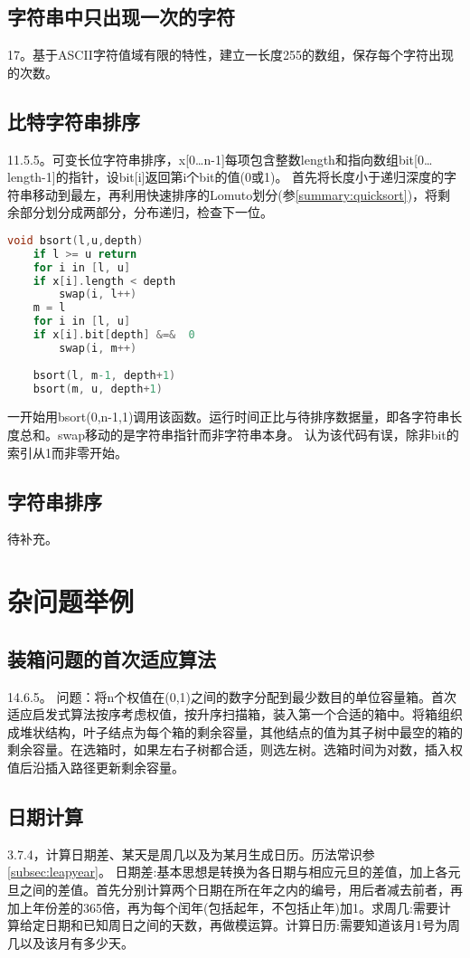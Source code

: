 \subsection{字符串中只出现一次的字符}
\cite{ms100}17。基于ASCII字符值域有限的特性，建立一长度255的数组，保存每个字符出现的次数。


\subsection{比特字符串排序}
\cite{pp}11.5.5。可变长位字符串排序，x[0\ldots n-1]每项包含整数length和指向数组bit[0\dots length-1]的指针，设bit[i]返回第i个bit的值(0或1)。 首先将长度小于递归深度的字符串移动到最左，再利用快速排序的Lomuto划分(参\ref{summary:quicksort})，将剩余部分划分成两部分，分布递归，检查下一位。

\begin{lstlisting}[language=C]
void bsort(l,u,depth)
    if l >= u return
    for i in [l, u]
	if x[i].length < depth
	    swap(i, l++)
    m = l
    for i in [l, u]
	if x[i].bit[depth] &=&  0
	    swap(i, m++)
    
    bsort(l, m-1, depth+1)
    bsort(m, u, depth+1)
\end{lstlisting}

一开始用bsort(0,n-1,1)调用该函数。运行时间正比与待排序数据量，即各字符串长度总和。swap移动的是字符串指针而非字符串本身。 \cite{self}认为该代码有误，除非bit的索引从1而非零开始。

\subsection{字符串排序}
\cite{self}待补充。



\section{杂问题举例}

\subsection{装箱问题的首次适应算法}
\cite{pp}14.6.5。
问题：将n个权值在(0,1)之间的数字分配到最少数目的单位容量箱。首次适应启发式算法按序考虑权值，按升序扫描箱，装入第一个合适的箱中。将箱组织成堆状结构，叶子结点为每个箱的剩余容量，其他结点的值为其子树中最空的箱的剩余容量。在选箱时，如果左右子树都合适，则选左树。选箱时间为对数，插入权值后沿插入路径更新剩余容量。

\subsection{日期计算}
\cite{pp}3.7.4，计算日期差、某天是周几以及为某月生成日历。历法常识参\ref{subsec:leapyear}。
日期差:基本思想是转换为各日期与相应元旦的差值，加上各元旦之间的差值。首先分别计算两个日期在所在年之内的编号，用后者减去前者，再加上年份差的365倍，再为每个闰年(包括起年，不包括止年)加1。求周几:需要计算给定日期和已知周日之间的天数，再做模运算。计算日历:需要知道该月1号为周几以及该月有多少天。

